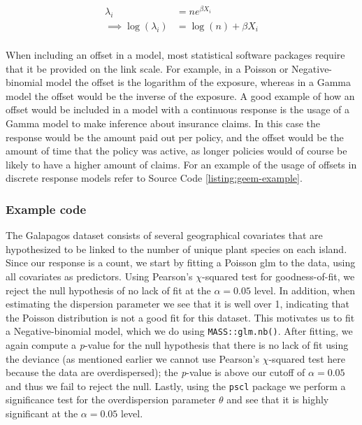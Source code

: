 \documentclass{report}
\begin{document}
\begin{equation}\label{eq:glm-poisson-offset form}
    \begin{aligned}
        \lambda_i &= ne^{\beta X_i} \\
        \implies \log(\lambda_i) &= \log(n) + \beta X_i \\
    \end{aligned}
\end{equation}

When including an offset in a model, most statistical software packages require that it be provided on the link scale. For example, in a Poisson or Negative-binomial model the offset is the logarithm of the exposure, whereas in a Gamma model the offset would be the inverse of the exposure. A good example of how an offset would be included in a model with a continuous response is the usage of a Gamma model to make inference about insurance claims. In this case the response would be the amount paid out per policy, and the offset would be the amount of time that the policy was active, as longer policies would of course be likely to have a higher amount of claims. For an example of the usage of offsets in discrete response models refer to Source Code \ref{listing:geem-example}. 

\subsubsection{Example code}

The Galapagos dataset consists of several geographical covariates that are hypothesized to be linked to the number of unique plant species on each island. Since our response is a count, we start by fitting a Poisson \gls{glm} to the data, using all covariates as predictors. Using Pearson's $\chi$-squared test for goodness-of-fit, we reject the null hypothesis of no lack of fit at the $\alpha = 0.05$ level. In addition, when estimating the dispersion parameter we see that it is well over 1, indicating that the Poisson distribution is not a good fit for this dataset. This motivates us to fit a Negative-binomial model, which we do using \texttt{MASS::glm.nb()}. After fitting, we again compute a \textit{p}-value for the null hypothesis that there is no lack of fit using the deviance (as mentioned earlier we cannot use Pearson's $\chi$-squared test here because the data are overdispersed); the \textit{p}-value is above our cutoff of $\alpha = 0.05$ and thus we fail to reject the null. Lastly, using the \texttt{pscl} package we perform a significance test for the overdispersion parameter $\theta$ and see that it is highly significant at the $\alpha = 0.05$ level. 
\end{document}
